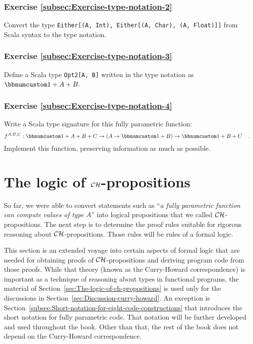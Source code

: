 \subsubsection{Exercise \label{subsec:Exercise-type-notation-2}\ref{subsec:Exercise-type-notation-2}}

Convert the type \lstinline!Either[(A, Int), Either[(A, Char), (A, Float)]]!
from Scala syntax to the type notation. 

\subsubsection{Exercise \label{subsec:Exercise-type-notation-3}\ref{subsec:Exercise-type-notation-3}}

Define a Scala type \lstinline!Opt2[A, B]! written in the type notation
as $\bbnum 1+A+B$.

\subsubsection{Exercise \label{subsec:Exercise-type-notation-4}\ref{subsec:Exercise-type-notation-4}}

Write a Scala type signature for this fully parametric function:
\[
f^{A,B,C}:\bbnum 1+A+B+C\rightarrow\left(A\rightarrow\bbnum 1+B\right)\rightarrow\bbnum 1+B+C\quad.
\]
Implement this function, preserving information as much as possible.

\section{The logic of ${\cal CH}$-propositions\label{sec:The-logic-of-ch-propositions}}

So far, we were able to convert statements such as \textsf{``}\emph{a fully
parametric function can compute values of type} $A$\textsf{''} into logical
propositions that we called ${\cal CH}$-propositions. The next step
is to determine the proof rules suitable for rigorous reasoning about
${\cal CH}$-propositions. Those rules will be rules of a formal logic.

This section is an extended voyage into certain aspects of formal
logic that are needed for obtaining proofs of ${\cal CH}$-propositions
and deriving program code from those proofs. While that theory (known
as the Curry-Howard correspondence)
is important as a technique of reasoning about types in functional
programs, the material of Section~\ref{sec:The-logic-of-ch-propositions}
is used only for the discussions in Section~\ref{sec:Discussion-curry-howard}.
An exception is Section~\ref{subsec:Short-notation-for-eight-code-constructions}
that introduces the short notation for fully parametric code. That
notation will be further developed and used throughout the book. Other
than that, the rest of the book does not depend on the Curry-Howard
correspondence.

